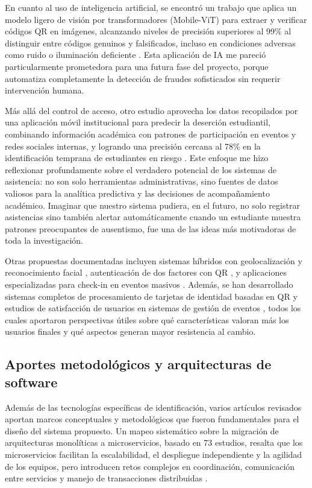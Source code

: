 En cuanto al uso de inteligencia artificial, se encontró un trabajo que aplica un modelo ligero de visión por transformadores (Mobile-ViT) para extraer y verificar códigos QR en imágenes, alcanzando niveles de precisión superiores al 99\% al distinguir entre códigos genuinos y falsificados, incluso en condiciones adversas como ruido o iluminación deficiente \cite{zihan2024dl_qr_verification}. Esta aplicación de IA me pareció particularmente prometedora para una futura fase del proyecto, porque automatiza completamente la detección de fraudes sofisticados sin requerir intervención humana.

Más allá del control de acceso, otro estudio aprovecha los datos recopilados por una aplicación móvil institucional para predecir la deserción estudiantil, combinando información académica con patrones de participación en eventos y redes sociales internas, y logrando una precisión cercana al 78\% en la identificación temprana de estudiantes en riesgo \cite{matz2023student_retention_ml}. Este enfoque me hizo reflexionar profundamente sobre el verdadero potencial de los sistemas de asistencia: no son solo herramientas administrativas, sino fuentes de datos valiosos para la analítica predictiva y las decisiones de acompañamiento académico. Imaginar que nuestro sistema pudiera, en el futuro, no solo registrar asistencias sino también alertar automáticamente cuando un estudiante muestra patrones preocupantes de ausentismo, fue una de las ideas más motivadoras de toda la investigación.

Otras propuestas documentadas incluyen sistemas híbridos con geolocalización y reconocimiento facial \cite{babatunde2022geo_face_attendance}, autenticación de dos factores con QR \cite{selvam2023bkmi_event_qr_2fa}, y aplicaciones especializadas para check-in en eventos masivos \cite{collins2025event_qr_checkin}. Además, se han desarrollado sistemas completos de procesamiento de tarjetas de identidad basadas en QR \cite{eme2024qr_idcard_auth} y estudios de satisfacción de usuarios en sistemas de gestión de eventos \cite{julian2021user_satisfaction_event}, todos los cuales aportaron perspectivas útiles sobre qué características valoran más los usuarios finales y qué aspectos generan mayor resistencia al cambio.

\subsection{Aportes metodológicos y arquitecturas de software}

Además de las tecnologías específicas de identificación, varios artículos revisados aportan marcos conceptuales y metodológicos que fueron fundamentales para el diseño del sistema propuesto. Un mapeo sistemático sobre la migración de arquitecturas monolíticas a microservicios, basado en 73 estudios, resalta que los microservicios facilitan la escalabilidad, el despliegue independiente y la agilidad de los equipos, pero introducen retos complejos en coordinación, comunicación entre servicios y manejo de transacciones distribuidas \cite{razzaq2023monolith_microservices}.

